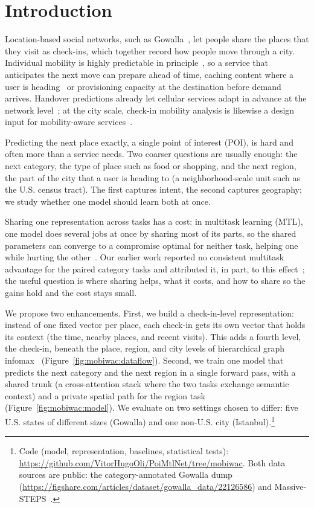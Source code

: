 \section{Introduction}
\label{sec:mobiwac:intro}

Location-based social networks, such as Gowalla~\cite{cho2011gowalla}, let people share the places that they visit as check-ins, which together record how people move through a city. Individual mobility is highly predictable in principle~\cite{song2010limits}, so a service that anticipates the next move can prepare ahead of time, caching content where a user is heading~\cite{bastug2014edge} or provisioning capacity at the destination before demand arrives. Handover predictions already let cellular services adapt in advance at the network level~\cite{vielhaus2022handover}; at the city scale, check-in mobility analysis is likewise a design input for mobility-aware services~\cite{moura2025mobilityaware}.

Predicting the next place exactly, a single point of interest (POI), is hard and often more than a service needs. Two coarser questions are usually enough: the next category, the type of place such as food or shopping, and the next region, the part of the city that a user is heading to (a neighborhood-scale unit such as the U.S. census tract). The first captures intent, the second captures geography; we study whether one model should learn both at once.

Sharing one representation across tasks has a cost: in multitask learning (MTL), one model does several jobs at once by sharing most of its parts, so the shared parameters can converge to a compromise optimal for neither task, helping one while hurting the other~\cite{caruana1997multitask}. Our earlier
work reported no consistent multitask advantage for the paired category tasks and attributed it, in part, to this effect~\cite{silva2025mtlnet}; the useful question is where sharing helps, what it costs, and how to share so the gains hold and the cost stays small.

We propose two enhancements. First, we build a check-in-level representation: instead of one fixed vector per place, each check-in gets its own vector that holds its context (the time, nearby places, and recent visits).
This adds a fourth level, the check-in, beneath the place, region, and city levels of hierarchical graph infomax~\cite{huang2023hgi,velickovic2019deep} (Figure~\ref{fig:mobiwac:dataflow}). Second, we train one model that
predicts the next category and the next region in a single forward pass, with a shared trunk (a cross-attention stack where the two tasks exchange
semantic context) and a private spatial path for the region task (Figure~\ref{fig:mobiwac:model}). We evaluate on two settings chosen to differ: five U.S. states of different sizes (Gowalla) and one non-U.S. city (Istanbul).\footnote{\label{fn:mobiwac:code}Code (model, representation, baselines, statistical tests): \url{https://github.com/VitorHugoOli/PoiMtlNet/tree/mobiwac}. Both data sources are public: the category-annotated Gowalla dump (\url{https://figshare.com/articles/dataset/gowalla_data/22126586}) and Massive-STEPS~\cite{wongso2025massivesteps}.}

